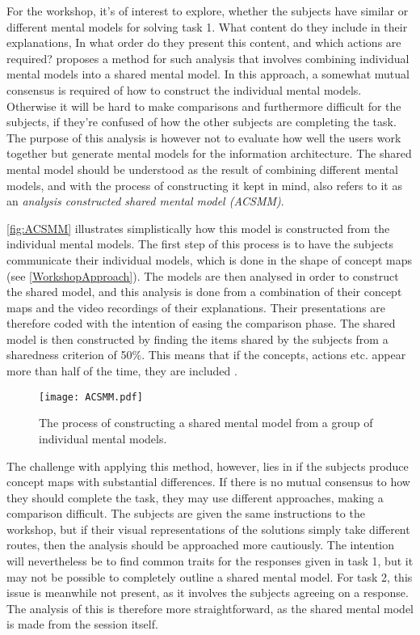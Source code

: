 \noindent
For the workshop, it's of interest to explore, whether the subjects have similar or different mental models for solving task 1. What content do they include in their explanations, In what order do they present this content, and which actions are required? \textcite{WEB:ConceptMapAnalysis} proposes a method for such analysis that involves combining individual mental models into a shared mental model. In this approach, a somewhat mutual consensus is required of how to construct the individual mental models. Otherwise it will be hard to make comparisons and furthermore difficult for the subjects, if they're confused of how the other subjects are completing the task. The purpose of this analysis is however not to evaluate how well the users work together but generate mental models for the information architecture. The shared mental model should be understood as the result of combining different mental models, and with the process of constructing it kept in mind, \textcite{WEB:ConceptMapAnalysis} also refers to it as an \textit{analysis constructed shared mental model (ACSMM)}.

\autoref{fig:ACSMM} illustrates simplistically how this model is constructed from the individual mental models. The first step of this process is to have the subjects communicate their individual models, which is done in the shape of concept maps (see \autoref{WorkshopApproach}). The models are then analysed in order to construct the shared model, and this analysis is done from a combination of their concept maps and the video recordings of their explanations. Their presentations are therefore coded with the intention of easing the comparison phase. The shared model is then constructed by finding the items shared by the subjects from a sharedness criterion of 50\%. This means that if the concepts, actions etc. appear more than half of the time, they are included \parencite[][128]{WEB:ConceptMapAnalysis}.
%
\begin{figure}[H]
	\centering
	\texttt{[image: ACSMM.pdf]}
	\caption{The process of constructing a shared mental model from a group of individual mental models.}
	\label{fig:ACSMM}
\end{figure}
%
\noindent
The challenge with applying this method, however, lies in if the subjects produce concept maps with substantial differences. If there is no mutual consensus to how they should complete the task, they may use different approaches, making a comparison difficult. The subjects are given the same instructions to the workshop, but if their visual representations of the solutions simply take different routes, then the analysis should be approached more cautiously. The intention will nevertheless be to find common traits for the responses given in task 1, but it may not be possible to completely outline a shared mental model. For task 2, this issue is meanwhile not present, as it involves the subjects agreeing on a response. The analysis of this is therefore more straightforward, as the shared mental model is made from the session itself.

